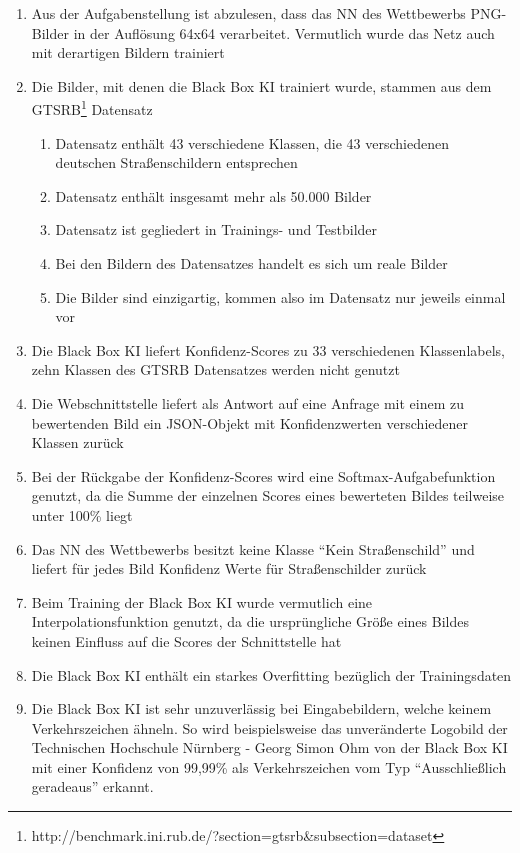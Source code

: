 \begin{enumerate}
	\item Aus der Aufgabenstellung ist abzulesen, dass das \ac{NN} des Wettbewerbs PNG-Bilder in der Auflösung 64x64 verarbeitet. Vermutlich wurde das Netz auch mit derartigen Bildern trainiert
	\item Die Bilder, mit denen die Black Box \ac{KI} trainiert wurde, stammen aus dem GTSRB\footnote{http://benchmark.ini.rub.de/?section=gtsrb\&subsection=dataset} Datensatz
	\begin{enumerate}
		\item Datensatz enthält 43 verschiedene Klassen, die 43 verschiedenen deutschen Straßenschildern entsprechen
		\item Datensatz enthält insgesamt mehr als 50.000 Bilder
		\item Datensatz ist gegliedert in Trainings- und Testbilder
		\item Bei den Bildern des Datensatzes handelt es sich um reale Bilder
		\item Die Bilder sind einzigartig, kommen also im Datensatz nur jeweils einmal vor
	\end{enumerate}
	\item Die Black Box \ac{KI} liefert Konfidenz-Scores zu 33 verschiedenen Klassenlabels, zehn Klassen des \ac{GTSRB} Datensatzes werden nicht genutzt
	\item Die Webschnittstelle liefert als Antwort auf eine Anfrage mit einem zu bewertenden Bild ein JSON-Objekt mit Konfidenzwerten verschiedener Klassen zurück
	\item Bei der Rückgabe der Konfidenz-Scores wird eine Softmax-Aufgabefunktion genutzt, da die Summe der einzelnen Scores eines bewerteten Bildes teilweise unter 100\% liegt
	\item Das \ac{NN} des Wettbewerbs besitzt keine Klasse "`Kein Straßenschild"' und liefert für jedes Bild Konfidenz Werte für Straßenschilder zurück
	\item Beim Training der Black Box \ac{KI} wurde vermutlich eine Interpolationsfunktion genutzt, da die ursprüngliche Größe eines Bildes keinen Einfluss auf die Scores der Schnittstelle hat  
	\item Die Black Box \ac{KI} enthält ein starkes Overfitting bezüglich der Trainingsdaten
	\item Die Black Box \ac{KI} ist sehr unzuverlässig bei Eingabebildern, welche keinem Verkehrszeichen ähneln. So wird beispielsweise das unveränderte Logobild der Technischen Hochschule Nürnberg - Georg Simon Ohm von der Black Box \ac{KI} mit einer Konfidenz von 99,99\% als Verkehrszeichen vom Typ "`Ausschließlich geradeaus"' erkannt.
\end{enumerate}


